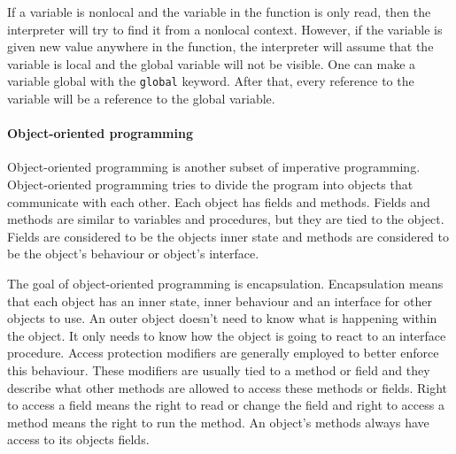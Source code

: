 

If a variable is nonlocal and the variable in the function is only read, then
the interpreter will try to find it from a nonlocal context. However, if the
variable is given new value anywhere in the function, the interpreter will
assume that the variable is local and the global variable will not be visible.
One can make a variable global with the \texttt{global} keyword. After that,
every reference to the variable will be a reference to the global variable.

\paragraph{Object-oriented programming}

Object-oriented programming is another subset of imperative programming.
Object-oriented programming tries to divide the program into objects that
communicate with each other. Each object has fields and methods. Fields and
methods are similar to variables and procedures, but they are tied to the
object. Fields are considered to be the objects inner state and methods are
considered to be the object's behaviour or object's
interface.\cite{website:object-orientation}

The goal of object-oriented programming is encapsulation. Encapsulation means
that each object has an inner state, inner behaviour and an interface for other
objects to use. An outer object doesn't need to know what is happening within
the object. It only needs to know how the object is going to react to an
interface procedure. Access protection modifiers are generally employed to
better enforce this behaviour. These modifiers are usually tied to a method or
field and they describe what other methods are allowed to access these methods
or fields. Right to access a field means the right to read or change the field
and right to access a method means the right to run the
method. An object's methods always have access to its objects
fields.\cite{website:access-modifiers}

